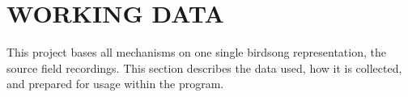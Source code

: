 \chapter{WORKING DATA}

This project bases all mechanisms on one single birdsong representation, the
source field recordings.
This section describes the data used, how it is collected, and prepared for
usage within the program.

